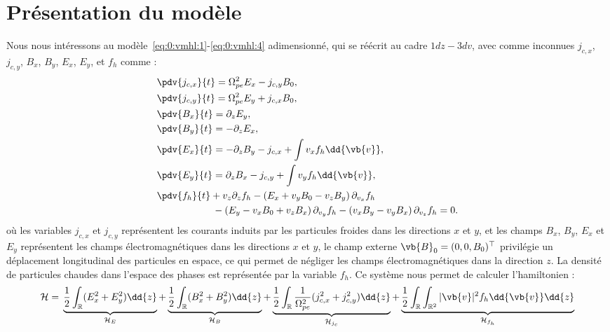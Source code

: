 
\section{Présentation du modèle}

Nous nous intéressons au modèle~\eqref{eq:0:vmhl:1}-\eqref{eq:0:vmhl:4} adimensionné, qui se réécrit au cadre $1dz-3dv$, avec comme inconnues $j_{c,x}$, $j_{c,y}$, $B_{x}$, $B_{y}$, $E_{x}$, $E_{y}$, et $f_h$ comme :
\begin{align}
  \label{eq:VHM:jx}
  &\pdv{j_{c,x}}{t} = \Omega_{pe}^2 { E}_x - { j}_{c,y}B_0,\\
  \label{eq:VHM:jy}
  &\pdv{j_{c,y}}{t} = \Omega_{pe}^2 { E}_y + { j}_{c,x}B_0,\\
  \label{eq:VHM:Bx}
  &\pdv{B_{x  }}{t} = \partial_z E_y,\\
  \label{eq:VHM:By}
  &\pdv{B_{y  }}{t} = -\partial_z E_x,\\
  \label{eq:VHM:Ex}
  &\pdv{E_{x  }}{t} =-\partial_z B_y - {j}_{c,x} + \int v_x f_h \dd{\vb{v}},\\
  \label{eq:VHM:Ey}
  &\pdv{E_{y  }}{t} =\partial_z B_x - {j}_{c,y} + \int v_y f_h \dd{\vb{v}}, \\
  \label{eq:VHM:fh}
  &\pdv{f_{h  }}{t} +  v_z\partial_z f_h - \left(E_x + v_y B_0 - v_zB_y\right)\partial_{v_x} f_h\\
  &\hspace{2cm}- \left(E_y - v_x B_0 + v_z B_x\right)\partial_{v_y} f_h- \left(v_x B_y- v_y B_x\right)\partial_{v_z} f_h = 0.\nonumber
\end{align}
où les variables $j_{c,x}$ et $j_{c,y}$ représentent les courants induits par les particules froides dans les directions $x$ et $y$, et les champs $B_x$, $B_y$, $E_x$ et $E_y$ représentent les champs électromagnétiques dans les directions $x$ et $y$, le champ externe $\vb{B}_0=(0,0,B_0)^\top$ privilégie un déplacement longitudinal des particules en espace, ce qui permet de négliger les champs électromagnétiques dans la direction $z$. La densité de particules chaudes dans l'espace des phases est représentée par la variable $f_h$. Ce système nous permet de calculer l'hamiltonien :
\begin{equation}
  \mathcal{H} = {}
      \underbrace{\frac{1}{2}\int_{\mathbb{R}}(E_x^2+E_y^2) \dd{z}}_{\mathcal{H}_E}
    + \underbrace{\frac{1}{2}\int_{\mathbb{R}}(B_x^2+B_y^2) \dd{z}}_{\mathcal{H}_B}
    + \underbrace{\frac{1}{2}\int_{\mathbb{R}}\frac{1}{\Omega_{pe}^2}(j_{c,x}^2+j_{c,y}^2) \dd{z}}_{\mathcal{H}_{j_c}}
    + \underbrace{\frac{1}{2}\int_{\mathbb{R}}\int_{\mathbb{R}^2}|\vb{v}|^2 f_h \dd{\vb{v}}\dd{z}}_{\mathcal{H}_{f_h}}
  \label{eq:ham1dz3dv}
\end{equation}
